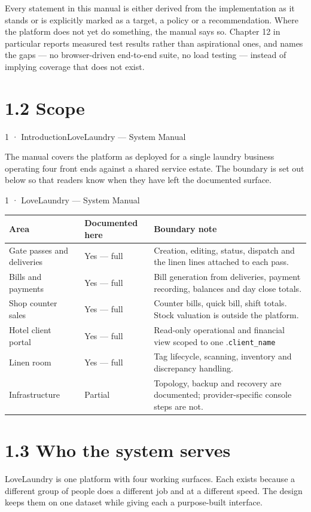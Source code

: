 \documentclass[11pt,a4paper,oneside]{book}
\begin{document}
Every statement in this manual is either derived from the implementation as it stands or is explicitly marked as a target, a policy or a recommendation. Where the platform does not yet do something, the manual says so. Chapter 12 in particular reports measured test results rather than aspirational ones, and names the gaps — no browser-driven end-to-end suite, no load testing — instead of implying coverage that does not exist.

\section{1.2 Scope}
1 · IntroductionLoveLaundry — System Manual

The manual covers the platform as deployed for a single laundry business operating four front ends against a shared service estate. The boundary is set out below so that readers know when they have left the documented surface.

1 · LoveLaundry — System Manual

\begin{center}\small
\begin{tabularx}{\linewidth}{|X|X|X|}
\hline
\rowcolor{lightgrey}
\textbf{Area} & \textbf{Documented here} & \textbf{Boundary note} \\ \hline
Gate passes and deliveries & Yes — full & Creation, editing, status, dispatch and the linen lines attached to each pass. \\ \hline
Bills and payments & Yes — full & Bill generation from deliveries, payment recording, balances and day close totals. \\ \hline
Shop counter sales & Yes — full & Counter bills, quick bill, shift totals. Stock valuation is outside the platform. \\ \hline
Hotel client portal & Yes — full & Read-only operational and financial view scoped to one .\texttt{client\_name} \\ \hline
Linen room & Yes — full & Tag lifecycle, scanning, inventory and discrepancy handling. \\ \hline
Infrastructure & Partial & Topology, backup and recovery are documented; provider-specific console steps are not. \\ \hline
\end{tabularx}
\end{center}
\section{1.3 Who the system serves}
LoveLaundry is one platform with four working surfaces. Each exists because a different group of people does a different job and at a different speed. The design keeps them on one dataset while giving each a purpose-built interface.
\end{document}
